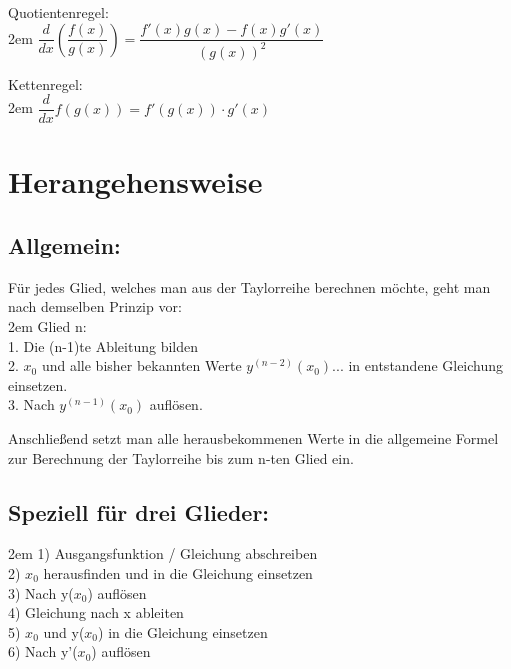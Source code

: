 \documentclass[11pt,final]{scrreprt}
\newcommand{\br} {\medskip\\}
\begin{document}
Quotientenregel:\\

\begingroup
\leftskip2em 
$ \dfrac{d}{dx} \left( \dfrac{f(x)}{g(x)}\right) = \dfrac{f'(x)g(x)-f(x)g'(x)}{(g(x))^2}$\\
\par	
\endgroup 

Kettenregel:\\

\begingroup
\leftskip2em 
$ \dfrac{d}{dx} f(g(x)) = f'(g(x))\cdot g'(x)$\\
\par	
\endgroup 

\section{Herangehensweise}

\subsection*{Allgemein:}

Für jedes Glied, welches man aus der Taylorreihe berechnen möchte, geht man nach demselben Prinzip vor:\\

\begingroup
\leftskip2em 
Glied n:\\
1. Die (n-1)te Ableitung bilden\\
2. $x_0$ und alle bisher bekannten Werte $y^{(n-2)}(x_0) ...$ in entstandene Gleichung einsetzen.\\
3. Nach $y^{(n-1)}(x_0)$ auflösen.\\
\par	
\endgroup 

Anschließend setzt man alle herausbekommenen Werte in die allgemeine Formel zur Berechnung der Taylorreihe bis zum n-ten Glied ein.

\subsection*{Speziell für drei Glieder:}

\begingroup
\leftskip2em 
1) Ausgangsfunktion / Gleichung abschreiben\\
2) $x_0$ herausfinden und in die Gleichung einsetzen\\
3) Nach y($x_0$) auflösen\br

4) Gleichung nach x ableiten\\
5) $x_0$ und y($x_0$) in die Gleichung einsetzen\\
6) Nach y'($x_0$) auflösen\br
\end{document}

